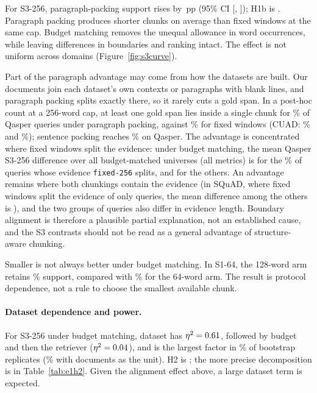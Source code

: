 \documentclass[11pt]{article}
\newcommand{\pp}{\ensuremath{\,\mathrm{pp}}}
\newcommand{\chunk}[1]{\texttt{#1}}
\begin{document}
For S3-256, paragraph-packing support rises by \HOneBEst\pp{} (95\% CI [\HOneBLo, \HOneBHi]); H1b is \HOneBVerdict. Paragraph packing produces shorter chunks on average than fixed windows at the same cap. Budget matching removes the unequal allowance in word occurrences, while leaving differences in boundaries and ranking intact. The effect is not uniform across domains (Figure~\ref{fig:s3curve}).

Part of the paragraph advantage may come from how the datasets are built. Our documents join each dataset's own contexts or paragraphs with blank lines, and paragraph packing splits exactly there, so it rarely cuts a gold span. In a post-hoc count at a 256-word cap, at least one gold span lies inside a single chunk for \ContainParagraphQasper\% of Qasper queries under paragraph packing, against \ContainFixedQasper\% for fixed windows (CUAD: \ContainParagraphCuad\% and \ContainFixedCuad\%); sentence packing reaches \ContainSentenceQasper\% on Qasper. The advantage is concentrated where fixed windows split the evidence: under budget matching, the mean Qasper S3-256 difference over all budget-matched universes (all metrics) is \QasperSplitDelta{} for the \QasperSplitShare\% of queries whose evidence \chunk{fixed-256} splits, and \QasperContainedDelta{} for the others. An advantage remains where both chunkings contain the evidence (in SQuAD, where fixed windows split the evidence of only \SquadSplitN{} queries, the mean difference among the others is \SquadContainedDelta), and the two groups of queries also differ in evidence length. Boundary alignment is therefore a plausible partial explanation, not an established cause, and the S3 contrasts should not be read as a general advantage of structure-aware chunking.

Smaller is not always better under budget matching. In S1-64, the 128-word arm retains \SoneSixFourBudgetB\% support, compared with \SoneSixFourBudgetA\% for the 64-word arm. The result is protocol dependence, not a rule to choose the smallest available chunk.

\paragraph{Dataset dependence and power.}
For S3-256 under budget matching, dataset has $\eta^2=0.61$, followed by budget and then the retriever ($\eta^2=0.04$), and is the largest factor in \HTwoFraction\% of bootstrap replicates (\HTwoDocFraction\% with documents as the unit). H2 is \HTwoVerdict; the more precise decomposition is in Table~\ref{tab:e1h2}. Given the alignment effect above, a large dataset term is expected.
\end{document}
